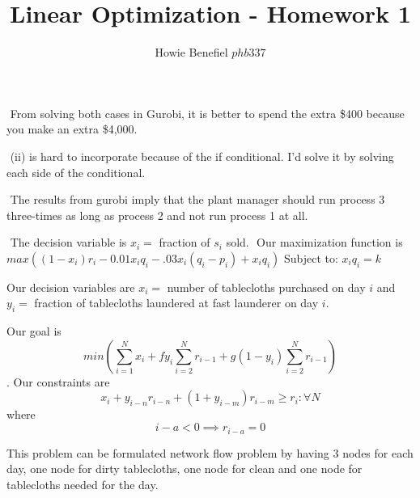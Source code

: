 \documentclass[12pt]{article}
\newenvironment{problem}[2][Problem]{\begin{trivlist}
\item[\hskip \labelsep {\bfseries #1}\hskip \labelsep {\bfseries #2.}]}{\end{trivlist}}
\theoremstyle{definition}
\begin{document}

\title{Linear Optimization - Homework 1}
\author{Howie Benefiel \(phb337\)}
\maketitle

\begin{problem}{1}
$ $ \newline
From solving both cases in Gurobi, it is better to spend the extra \$400 because you make
an extra \$4,000.

\end{problem}

\begin{problem}{2}
$ $ \newline
(ii) is hard to incorporate because of the if conditional.
I'd solve it by solving each side of the conditional.
\end{problem}

\begin{problem}{3}
$ $ \newline
The results from gurobi imply that the plant manager should run process 3 three-times as long as process 2 and not run process 1 at all.
\end{problem}

\begin{problem}{4}
$ $ \newline
The decision variable is $x_i =$ fraction of $s_i$ sold.
$ $ \newline
Our maximization function is $max((1-x_i)r_i - 0.01x_iq_i - .03x_i(q_i-p_i) + x_iq_i)$
Subject to: $x_iq_i=k$
\end{problem}

\begin{problem}{5}
Our decision variables are $x_i =$ number of tablecloths purchased on day $i$ and
$ y_i = $ fraction of tablecloths laundered at fast launderer on day $i$.

Our goal is $$min(\sum_{i=1}^N x_i + fy_i\sum_{i=2}^N r_{i-1} + g(1-y_i)\sum_{i=2}^Nr_{i-1})$$.
Our constraints are $$ x_i + y_{i-n}r_{i-n} + (1+y_{i-m})r_{i-m} \geq r_i: \forall N$$ where $$i - a < 0 \implies r_{i-a}=0$$
\end{problem}

\begin{problem}{6}
This problem can be formulated network flow problem by having 3 nodes for each day, one node for dirty tablecloths, one node for clean and one node for tablecloths needed for the day.
\end{problem}
\end{document}
